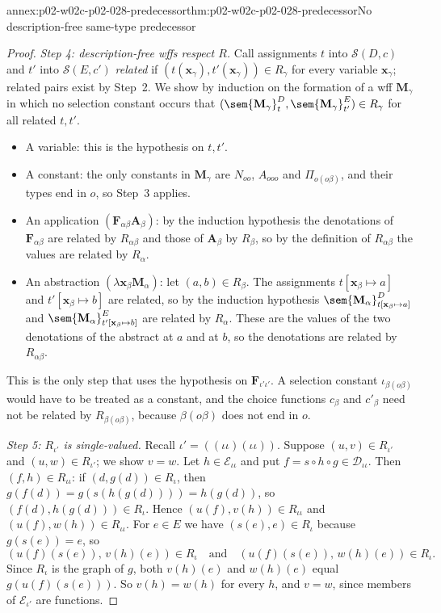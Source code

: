 \begin{annexitem}{annex:p02-w02c-p02-028-predecessor}{thm:p02-w02c-p02-028-predecessor}{No description-free same-type predecessor}
\begin{proof}
\emph{Step 4: description-free wffs respect \(R\).}  Call assignments
\(t\) into \(\mathcal S(D,c)\) and \(t'\) into \(\mathcal S(E,c')\)
\emph{related} if \((t(\mathbf x_\gamma),t'(\mathbf x_\gamma))\in R_\gamma\)
for every variable \(\mathbf x_\gamma\); related pairs exist by Step~2.  We
show by induction on the formation of a wff \(\mathbf M_\gamma\) in which no
selection constant occurs that
\((\sem{\mathbf M_\gamma}^D_t,\sem{\mathbf M_\gamma}^E_{t'})\in R_\gamma\)
for all related \(t,t'\).
\begin{itemize}
 \item A variable: this is the hypothesis on \(t,t'\).
 \item A constant: the only constants in \(\mathbf M_\gamma\) are
   \(N_{oo}\), \(A_{ooo}\) and \(\Pi_{o(o\beta)}\), and their types end in
   \(o\), so Step~3 applies.
 \item An application \((\mathbf F_{\alpha\beta}\mathbf A_\beta)\): by the
   induction hypothesis the denotations of \(\mathbf F_{\alpha\beta}\) are
   related by \(R_{\alpha\beta}\) and those of \(\mathbf A_\beta\) by
   \(R_\beta\), so by the definition of \(R_{\alpha\beta}\) the values are
   related by \(R_\alpha\).
 \item An abstraction \((\lambda\mathbf x_\beta\mathbf M_\alpha)\): let
   \((a,b)\in R_\beta\).  The assignments \(t[\mathbf x_\beta\mapsto a]\) and
   \(t'[\mathbf x_\beta\mapsto b]\) are related, so by the induction
   hypothesis \(\sem{\mathbf M_\alpha}^D_{t[\mathbf x_\beta\mapsto a]}\) and
   \(\sem{\mathbf M_\alpha}^E_{t'[\mathbf x_\beta\mapsto b]}\) are related by
   \(R_\alpha\).  These are the values of the two denotations of the
   abstract at \(a\) and at \(b\), so the denotations are related by
   \(R_{\alpha\beta}\).
\end{itemize}
This is the only step that uses the hypothesis on \(\mathbf F_{\iota'\iota'}\).
A selection constant \(\iota_{\beta(o\beta)}\) would have to be treated as a
constant, and the choice functions \(c_\beta\) and \(c'_\beta\) need not be
related by \(R_{\beta(o\beta)}\), because \(\beta(o\beta)\) does not end in
\(o\).

\emph{Step 5: \(R_{\iota'}\) is single-valued.}  Recall
\(\iota'=((\iota\iota)(\iota\iota))\).  Suppose \((u,v)\in R_{\iota'}\) and
\((u,w)\in R_{\iota'}\); we show \(v=w\).  Let \(h\in\mathcal E_{\iota\iota}\)
and put \(f=s\circ h\circ g\in\mathcal D_{\iota\iota}\).  Then
\((f,h)\in R_{\iota\iota}\): if \((d,g(d))\in R_\iota\), then
\(g(f(d))=g(s(h(g(d))))=h(g(d))\), so \((f(d),h(g(d)))\in R_\iota\).
Hence \((u(f),v(h))\in R_{\iota\iota}\) and \((u(f),w(h))\in R_{\iota\iota}\).
For \(e\in E\) we have \((s(e),e)\in R_\iota\) because \(g(s(e))=e\), so
\[
 (u(f)(s(e)),\,v(h)(e))\in R_\iota\quad\text{and}\quad(u(f)(s(e)),\,w(h)(e))\in R_\iota.
\]
Since \(R_\iota\) is the graph of \(g\), both \(v(h)(e)\) and \(w(h)(e)\)
equal \(g(u(f)(s(e)))\).  So \(v(h)=w(h)\) for every \(h\), and \(v=w\),
since members of \(\mathcal E_{\iota'}\) are functions.


\end{proof}
\end{annexitem}
